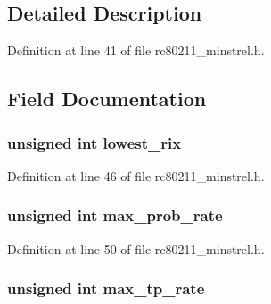 \subsection{Detailed Description}


Definition at line 41 of file rc80211\-\_\-minstrel.\-h.



\subsection{Field Documentation}
\hypertarget{structminstrel__sta__info_a8f2a0e4bbfab7a7d1848bed87ae6ff84}{
\subsubsection[{lowest\-\_\-rix}]{\setlength{\rightskip}{0pt plus 5cm}unsigned int lowest\-\_\-rix}}\label{structminstrel__sta__info_a8f2a0e4bbfab7a7d1848bed87ae6ff84}


Definition at line 46 of file rc80211\-\_\-minstrel.\-h.

\hypertarget{structminstrel__sta__info_a4a4625871f05851116acae11b392a957}{
\subsubsection[{max\-\_\-prob\-\_\-rate}]{\setlength{\rightskip}{0pt plus 5cm}unsigned int max\-\_\-prob\-\_\-rate}}\label{structminstrel__sta__info_a4a4625871f05851116acae11b392a957}


Definition at line 50 of file rc80211\-\_\-minstrel.\-h.

\hypertarget{structminstrel__sta__info_ae61b14461f5cfea710f666fe40906493}{
\subsubsection[{max\-\_\-tp\-\_\-rate}]{\setlength{\rightskip}{0pt plus 5cm}unsigned int max\-\_\-tp\-\_\-rate}}\label{structminstrel__sta__info_ae61b14461f5cfea710f666fe40906493}


